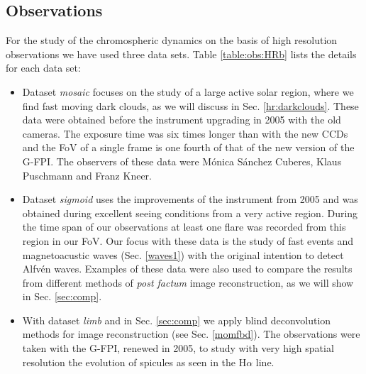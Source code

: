 \subsection{Observations\label{oberv}}
For the study of the chromospheric dynamics on the basis of high resolution observations we have used three  data sets. Table \ref{table:obs:HRb} lists the details for each data set:
\begin{itemize}
\item Dataset \textit{mosaic} focuses on the study of a large active solar region, where we find fast moving dark clouds, as we will discuss in Sec. \ref{hr:darkclouds}. These data were obtained before the instrument upgrading in 2005 \citep{2006A&A...451.1151P} with the old cameras. The exposure time was six times longer than with the new CCDs and the FoV of a single frame is one fourth of that of the new version of the G-FPI. The observers of these data were M\'onica S\'anchez Cuberes, Klaus Puschmann and Franz Kneer.

\item Dataset \textit{sigmoid} uses the improvements of the instrument from 2005 and was obtained during excellent seeing conditions from a very active region. During the time span of our observations at least one flare was recorded from this region in our FoV. Our focus with these data is the study of fast events and magnetoacustic waves (Sec. \ref{waves1}) with the original intention to detect Alfv\'en waves. Examples of these data were also used to compare the results from different methods of \emph{post factum} image reconstruction, as we will show in Sec. \ref{sec:comp}.

\item With dataset \textit{limb} and in Sec. \ref{sec:comp} we apply blind deconvolution methods for image reconstruction (see Sec. \ref{momfbd}). The observations were taken with the G-FPI, renewed in 2005, to study with very high spatial resolution the evolution of spicules as seen in the H$\alpha$ line.
\end{itemize}



